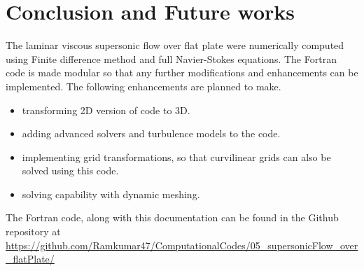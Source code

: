 \documentclass[conf]{new-aiaa}
\begin{document}
\section{Conclusion and Future works}
The laminar viscous supersonic flow over flat plate were numerically computed
using Finite difference method and full Navier-Stokes equations. The Fortran
code is made modular so that any further modifications and enhancements can be
implemented. The following enhancements are planned to make.
\begin{itemize}
    \item transforming 2D version of code to 3D.
    \item adding advanced solvers and turbulence models to the code.
    \item implementing grid transformations, so that curvilinear grids
        can also be solved using this code.
    \item solving capability with dynamic meshing.
\end{itemize}

\par The Fortran code, along with this documentation can be found in the
Github repository at \url{https://github.com/Ramkumar47/ComputationalCodes/05_supersonicFlow_over_flatPlate/}

% 

%


%
%     
%

\par
\center{**********}
\end{document}
